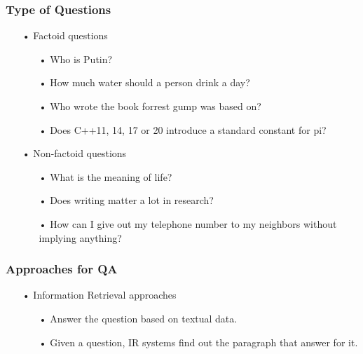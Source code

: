 \documentclass{beamer}
\begin{document}
\begin{frame}
	\footnotesize
	\frametitle{Type of Questions}
			
	\begin{itemize}
		\item[•] Factoid questions
			\begin{itemize}
				\item[•] Who is Putin?
				\item[•] How much water should a person drink a day?
				\item[•] Who wrote the book forrest gump was based on?
				\item[•] Does C++11, 14, 17 or 20 introduce a standard constant for pi?
			\end{itemize}
		
		\item[•] Non-factoid questions
			\begin{itemize}
			\item[•] What is the meaning of life?
			\item[•] Does writing matter a lot in research?
				\item[•] How can I give out my telephone number to my neighbors without implying anything?
			\end{itemize}
	\end{itemize}
			
\end{frame}


\begin{frame}
	\frametitle{Approaches for QA}		
			
	\begin{itemize}
		\item[•] Information Retrieval approaches
			\begin{itemize}
				\item[•] Answer the question based on textual data.
				\item[•] Given a question, IR systems find out the paragraph that answer for it.
			\end{itemize}
	\end{itemize}		
		
			
\end{frame}
\end{document}
